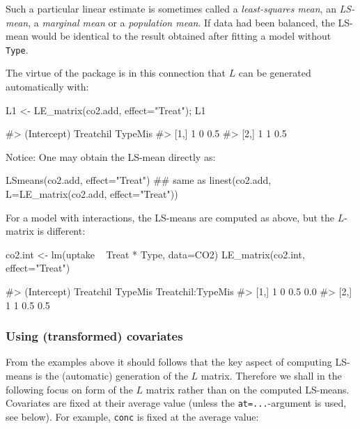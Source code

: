 Such a particular linear estimate is sometimes called a
\emph{least-squares mean}, an \emph{LS-mean}, a \emph{marginal mean} or
a \emph{population mean}. If data had been balanced, the LS-mean would
be identical to the result obtained after fitting a model without
\texttt{Type}.

The virtue of the  package is in this connection that
\(L\) can be generated automatically with:

\begin{Schunk}
\begin{Sinput}
L1 <- LE_matrix(co2.add, effect="Treat"); L1
\end{Sinput}
\begin{Soutput}
#>      (Intercept) Treatchil TypeMis
#> [1,]           1         0     0.5
#> [2,]           1         1     0.5
\end{Soutput}
\end{Schunk}

Notice: One may obtain the LS-mean directly as:

\begin{Schunk}
\begin{Sinput}
LSmeans(co2.add, effect="Treat")
## same as
linest(co2.add, L=LE_matrix(co2.add, effect="Treat"))
\end{Sinput}
\end{Schunk}

For a model with interactions, the LS-means are computed as above, but
the \(L\)-matrix is different:

\begin{Schunk}
\begin{Sinput}
co2.int <- lm(uptake ~ Treat * Type, data=CO2)
LE_matrix(co2.int, effect="Treat")
\end{Sinput}
\begin{Soutput}
#>      (Intercept) Treatchil TypeMis Treatchil:TypeMis
#> [1,]           1         0     0.5               0.0
#> [2,]           1         1     0.5               0.5
\end{Soutput}
\end{Schunk}

\hypertarget{using-transformed-covariates}{%
\subsubsection{Using (transformed)
covariates}\label{using-transformed-covariates}}

From the examples above it should follows that the key aspect of
computing LS-means is the (automatic) generation of the \(L\) matrix.
Therefore we shall in the following focus on form of the \(L\) matrix
rather than on the computed LS-means. Covariates are fixed at their
average value (unless the \texttt{at=...}-argument is used, see below).
For example, \texttt{conc} is fixed at the average value:

